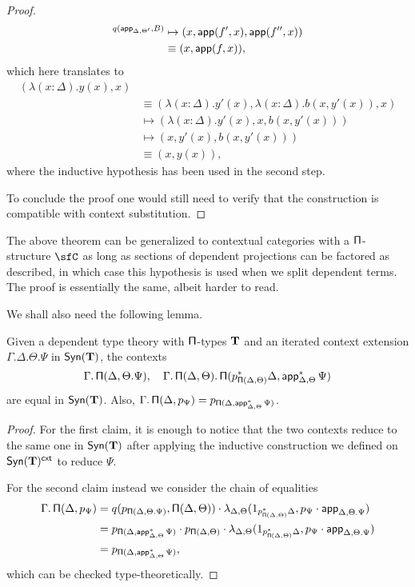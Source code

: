 \begin{proof}
\begin{align*}
    ^{q(\operatorname{\mathsf{app}}_{\Delta,\Theta'},B)}&\mapsto(x,\operatorname{\mathsf{app}}(f',x),\operatorname{\mathsf{app}}(f'',x)) \\
    &\equiv(x,\operatorname{\mathsf{app}}(f,x)),
  \end{align*}
  which here translates to
  \begin{align*}
    (\lambda(x:\Delta).y(x),x) \\
    &\equiv(\lambda(x:\Delta).y'(x),\lambda(x:\Delta).b(x,y'(x)),x) \\
    &\mapsto(\lambda(x:\Delta).y'(x),x,b(x,y'(x))) \\
    &\mapsto(x,y'(x),b(x,y'(x))) \\
    &\equiv(x,y(x)),
  \end{align*}
  where the inductive hypothesis has been used in the second step.

  To conclude the proof one would still need to verify that the construction is
  compatible with context substitution.
\end{proof}

\begin{rmk}
  The above theorem can be generalized to contextual categories with a
  $\operatorname{\mathsf{\Pi}}$-structure $\sfC$ as long as sections of dependent projections can be
  factored as described, in which case this hypothesis is used when we split
  dependent terms. The proof is essentially the same, albeit harder to read.
\end{rmk}

We shall also need the following lemma.

\begin{lem}\label{piequal}
  Given a dependent type theory with $\operatorname{\mathsf{\Pi}}$-types $\operatorname{\mathbf{T}}$ and an iterated context
  extension $\Gamma.\Delta.\Theta.\Psi$ in $\mathsf{Syn}(\mathbf{T})$, the contexts
  \[\Gamma.\operatorname{\mathsf{\Pi}}(\Delta,\Theta.\Psi),\quad\Gamma.\operatorname{\mathsf{\Pi}}(\Delta,\Theta).\operatorname{\mathsf{\Pi}}(p^*_{\operatorname{\mathsf{\Pi}}(\Delta,\Theta)}\Delta,\operatorname{\mathsf{app}}^*_{\Delta,\Theta}\Psi)\]
  are equal in $\mathsf{Syn}(\mathbf{T})$. Also,
  $\Gamma.\operatorname{\mathsf{\Pi}}(\Delta,p_{\Psi})=p_{\operatorname{\mathsf{\Pi}}(\Delta,\operatorname{\mathsf{app}}^*_{\Delta,\Theta}\Psi)}$.
\end{lem}
\begin{proof}
  For the first claim, it is enough to notice that the two contexts reduce to
  the same one in $\mathsf{Syn}(\mathbf{T})$ after applying the inductive construction we defined
  on $\mathsf{Syn}(\mathbf{T})^{\operatorname{\mathsf{cxt}}}$ to reduce $\Psi$.

  For the second claim instead we consider the chain of equalities
  \begin{align*}
    \Gamma.\operatorname{\mathsf{\Pi}}(\Delta,p_{\Psi})
    &=q(p_{\operatorname{\mathsf{\Pi}}(\Delta,\Theta.\Psi)},\operatorname{\mathsf{\Pi}}(\Delta,\Theta))\cdot
    \lambda_{\Delta,\Theta}(1_{p^*_{\operatorname{\mathsf{\Pi}}(\Delta,\Theta)}\Delta},p_\Psi\cdot\operatorname{\mathsf{app}}_{\Delta,\Theta.\Psi}) \\
    &=p_{\operatorname{\mathsf{\Pi}}(\Delta,\operatorname{\mathsf{app}}^*_{\Delta,\Theta}\Psi)}\cdot
    p_{\operatorname{\mathsf{\Pi}}(\Delta,\Theta)}\cdot
    \lambda_{\Delta,\Theta}(1_{p^*_{\operatorname{\mathsf{\Pi}}(\Delta,\Theta)}\Delta},p_\Psi\cdot\operatorname{\mathsf{app}}_{\Delta,\Theta.\Psi}) \\
    &=p_{\operatorname{\mathsf{\Pi}}(\Delta,\operatorname{\mathsf{app}}^*_{\Delta,\Theta}\Psi)},
  \end{align*}
  which can be checked type-theoretically.
\end{proof}

